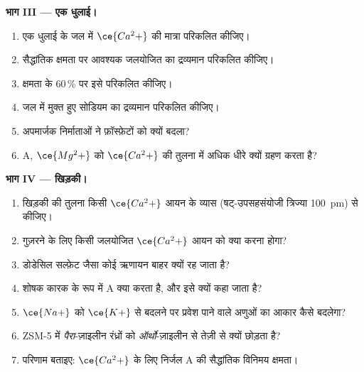 \begin{problem}
\medskip\noindent\textbf{भाग III --- एक धुलाई।}
\begin{enumerate}[resume]
  \item एक धुलाई के जल में $\ce{Ca^2+}$ की मात्रा परिकलित कीजिए।
  \item सैद्धांतिक क्षमता पर आवश्यक जलयोजित  का द्रव्यमान परिकलित कीजिए।
  \item क्षमता के 60\,\% पर इसे परिकलित कीजिए।
  \item जल में मुक्त हुए सोडियम का द्रव्यमान परिकलित कीजिए।
  \item अपमार्जक निर्माताओं ने फ़ॉस्फ़ेटों को क्यों बदला?
  \item {} A, $\ce{Mg^2+}$ को $\ce{Ca^2+}$ की तुलना में अधिक धीरे क्यों ग्रहण करता है?
\end{enumerate}

\medskip\noindent\textbf{भाग IV --- खिड़की।}
\begin{enumerate}[resume]
  \item खिड़की की तुलना किसी $\ce{Ca^2+}$ आयन के व्यास (षट्-उपसहसंयोजी त्रिज्या
        \qty{100}{pm}) से कीजिए।
  \item गुज़रने के लिए किसी जलयोजित $\ce{Ca^2+}$ आयन को क्या करना होगा?
  \item डोडेसिल सल्फ़ेट जैसा कोई  ऋणायन बाहर क्यों रह जाता है?
  \item शोषक कारक के रूप में  A क्या करता है, और इसे
         क्यों कहा जाता है?
  \item $\ce{Na+}$ को $\ce{K+}$ से बदलने पर प्रवेश पाने वाले अणुओं का आकार कैसे बदलेगा?
  \item ZSM-5 में \textit{पैरा}-ज़ाइलीन रंध्रों को \textit{ऑर्थो}-ज़ाइलीन से तेज़ी से क्यों छोड़ता है?
  \item परिणाम बताइए: $\ce{Ca^2+}$ के लिए निर्जल  A की सैद्धांतिक विनिमय
        क्षमता।
\end{enumerate}
\end{problem}
